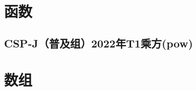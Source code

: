 \documentclass[12pt,twiside,a4paper]{ctexbook}
\numberwithin{chapter}{part}
\begin{document}
\chapter{函数}
\section{CSP-J（普及组）2022年T1乘方(pow)}

\chapter{数组}


\clearpage
\end{document}
